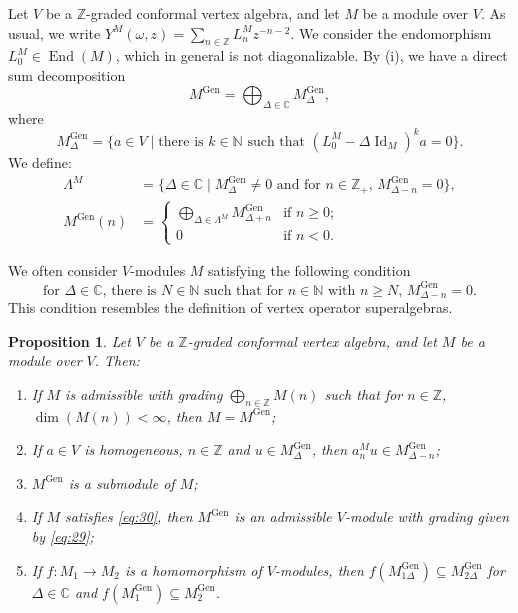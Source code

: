 \documentclass[a4paper, 12pt, reqno]{amsart}
\newtheorem{proposition}[theorem]{Proposition}
\theoremstyle{remark}
\DeclareMathOperator{\Id}{Id}
\DeclareMathOperator{\End}{End}
\DeclareMathOperator{\Gen}{Gen}
\begin{document}
Let $V$ be a $\mathbb{Z}$-graded conformal vertex algebra, and let $M$ be a module over $V$.
As usual, we write $Y^M(\omega, z) = \sum_{n \in \mathbb{Z}} L^M_nz^{-n - 2}$.
We consider the endomorphism $L^M_0 \in \End(M)$, which in general is not diagonalizable.
By (i), we have a direct sum decomposition
\begin{equation*}
  M^{\Gen} = \bigoplus_{\Delta \in \mathbb{C}}M^{\Gen}_{\Delta},
\end{equation*}
where
\begin{equation*}
  M^{\Gen}_{\Delta} = \{a \in V \mid \text{there is $k \in \mathbb{N}$ such that $(L_0^M - \Delta\Id_M)^ka = 0$}\}.
\end{equation*}
We define:
\begin{equation}
  \label{eq:29}
  \begin{split}
    \Lambda^M &= \{\Delta \in \mathbb{C} \mid \text{$M^{\Gen}_{\Delta} \neq 0$ and for $n \in \mathbb{Z}_+$, $M^{\Gen}_{\Delta - n} = 0$}\}, \\
    M^{\Gen}(n) &=
                  \begin{cases}
                    \bigoplus_{\Delta \in \Lambda^M}M^{\Gen}_{\Delta + n} &\text{if $n \ge 0$}; \\
                    0 &\text{if $n < 0$}.
                  \end{cases}
  \end{split}
\end{equation}

We often consider $V$-modules $M$ satisfying the following condition
\begin{equation}
  \label{eq:30}
  \text{for $\Delta \in \mathbb{C}$, there is $N \in \mathbb{N}$ such that for $n \in \mathbb{N}$ with $n \ge N$, $M^{\Gen}_{\Delta - n} = 0$}.
\end{equation}
This condition resembles the definition of vertex operator superalgebras.

\begin{proposition}
  \label{prp:10}
  Let $V$ be a $\mathbb{Z}$-graded conformal vertex algebra, and let $M$ be a module over $V$. Then:
  \begin{enumerate}
  \item If $M$ is admissible with grading $\bigoplus_{n \in \mathbb{Z}}M(n)$ such that for $n \in \mathbb{Z}$, $\dim(M(n)) < \infty$, then $M = M^{\Gen}$;
  \item If $a \in V$ is homogeneous, $n \in \mathbb{Z}$ and $u \in M^{\Gen}_{\Delta}$, then $a^M_nu \in M^{\Gen}_{\Delta - n}$;
  \item $M^{\Gen}$ is a submodule of $M$;
  \item If $M$ satisfies \eqref{eq:30}, then $M^{\Gen}$ is an admissible $V$-module with grading given by \eqref{eq:29};
  \item If $f: M_1 \to M_2$ is a homomorphism of $V$-modules, then $f(M^{\Gen}_{1\Delta}) \subseteq M^{\Gen}_{2\Delta}$ for $\Delta \in \mathbb{C}$ and $f(M^{\Gen}_1) \subseteq M^{\Gen}_2$.
  \end{enumerate}
\end{proposition}
\end{document}
